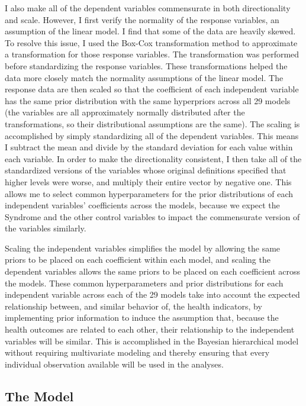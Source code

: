 I also make all of the dependent variables commensurate in both directionality and scale. However, I first verify the normality of the response variables, an assumption of the linear model. I find that some of the data are heavily skewed. To resolve this issue, I used the Box-Cox transformation \citep{boxcox} method to approximate a transformation for those response variables. The transformation was performed before standardizing the response variables. These transformations helped the data more closely match the normality assumptions of the linear model. The response data are then scaled so that the coefficient of each independent variable has the same prior distribution with the same hyperpriors across all 29 models (the variables are all approximately normally distributed after the transformations, so their distributional assumptions are the same). The scaling is accomplished by simply standardizing all of the dependent variables. This means I subtract the mean and divide by the standard deviation for each value within each variable. In order to make the directionality consistent, I then take all of the standardized versions of the variables whose original definitions specified that higher levels were worse, and multiply their entire vector by negative one. This allows me to select common hyperparameters for the prior distributions of each independent variables' coefficients across the models, because we expect the Syndrome and the other control variables to impact the commensurate version of the variables similarly. 

Scaling the independent variables simplifies the model by allowing the same priors to be placed on each coefficient within each model, and scaling the dependent variables allows the same priors to be placed on each coefficient across the models. These common hyperparameters and prior distributions for each independent variable across each of the 29 models take into account the expected relationship between, and similar behavior of, the health indicators, by implementing prior information to induce the assumption that, because the health outcomes are related to each other, their relationship to the independent variables will be similar. This is accomplished in the Bayesian hierarchical model without requiring multivariate modeling and thereby ensuring that every individual observation available will be used in the analyses.

\subsection{The Model}

